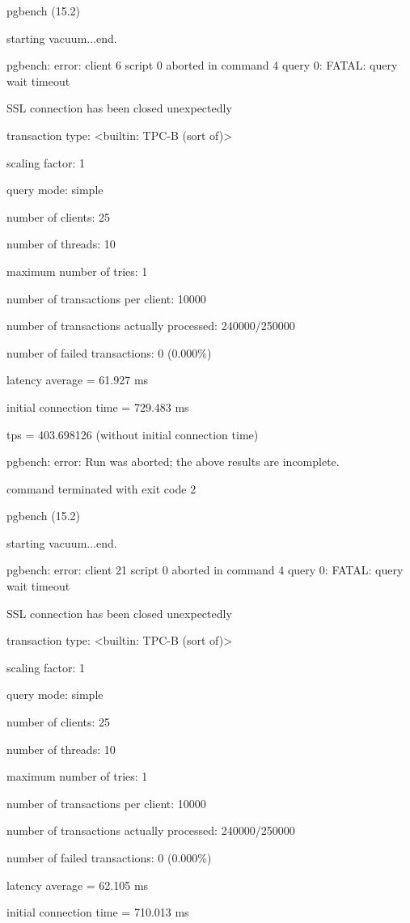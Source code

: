 
pgbench (15.2)

starting vacuum...end.

pgbench: error: client 6 script 0 aborted in command 4 query 0: FATAL:  query wait timeout

SSL connection has been closed unexpectedly

transaction type: <builtin: TPC-B (sort of)>

scaling factor: 1

query mode: simple

number of clients: 25

number of threads: 10

maximum number of tries: 1

number of transactions per client: 10000

number of transactions actually processed: 240000/250000

number of failed transactions: 0 (0.000\%)

latency average = 61.927 ms

initial connection time = 729.483 ms

tps = 403.698126 (without initial connection time)

pgbench: error: Run was aborted; the above results are incomplete.

command terminated with exit code 2

pgbench (15.2)

starting vacuum...end.

pgbench: error: client 21 script 0 aborted in command 4 query 0: FATAL:  query wait timeout

SSL connection has been closed unexpectedly

transaction type: <builtin: TPC-B (sort of)>

scaling factor: 1

query mode: simple

number of clients: 25

number of threads: 10

maximum number of tries: 1

number of transactions per client: 10000

number of transactions actually processed: 240000/250000

number of failed transactions: 0 (0.000\%)

latency average = 62.105 ms

initial connection time = 710.013 ms

